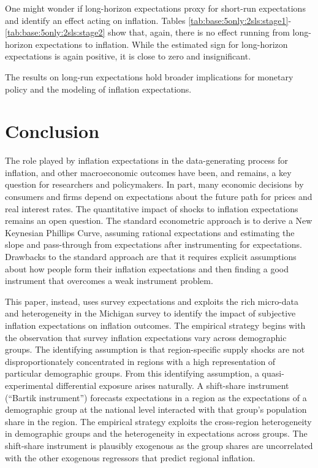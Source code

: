 \documentclass[12pt]{article}
\begin{document}



One might wonder if long-horizon expectations proxy for short-run expectations and identify an effect acting on inflation. Tables \ref{tab:base:5only:2sls:stage1}-\ref{tab:base:5only:2sls:stage2} show that, again, there is no effect running from long-horizon expectations to inflation. While the estimated sign for long-horizon expectations is again positive, it is close to zero and insignificant.  




The results on long-run expectations hold broader implications for monetary policy and the modeling of inflation expectations.
\section{Conclusion}


The role played by inflation expectations in the data-generating process for inflation, and other macroeconomic outcomes have been, and remains, a key question for researchers and policymakers. In part, many economic decisions by consumers and firms depend on expectations about the future path for prices and real interest rates. The quantitative impact of shocks to inflation expectations remains an open question. The standard econometric approach is to derive a New Keynesian Phillips Curve, assuming rational expectations and estimating the slope and pass-through from expectations after instrumenting for expectations. Drawbacks to the standard approach are that it requires explicit assumptions about how people form their inflation expectations and then finding a good instrument that overcomes a weak instrument problem.

This paper, instead, uses survey expectations and exploits the rich micro-data and heterogeneity in the Michigan survey to identify the impact of subjective inflation expectations on inflation outcomes. The empirical strategy begins with the observation that survey inflation expectations vary across demographic groups. The identifying assumption is that region-specific supply shocks are not disproportionately concentrated in regions with a high representation of particular demographic groups.  From this identifying assumption, a quasi-experimental differential exposure arises naturally. A shift-share instrument (``Bartik instrument'') forecasts expectations in a region as the expectations of a demographic group at the national level interacted with that group's population share in the region. The empirical strategy exploits the cross-region heterogeneity in demographic groups and the heterogeneity in expectations across groups. The shift-share instrument is plausibly exogenous as the group shares are uncorrelated with the other exogenous regressors that predict regional inflation.
\end{document}
